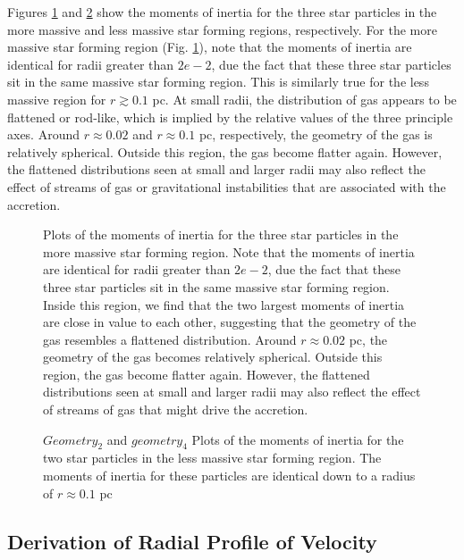\documentclass{emulateapj}
\begin{document}
Figures \ref{fig:geometry} and \ref{fig:geometry 2} show the moments of inertia for the three star particles in the more massive and less massive star forming regions, respectively.  For the more massive star forming region (Fig. \ref{fig:geometry}), note that the moments of inertia are identical for radii greater than $2e-2$, due the fact that these three star particles sit in the same massive star forming region. This is similarly true for the less massive region for $r\gtrsim 0.1$ pc.  At small radii, the distribution of gas appears to be flattened or rod-like, which is implied by the relative values of the three principle axes.  Around $r\approx 0.02$ and $r \approx 0.1$ pc, respectively, the geometry of the gas is relatively spherical.  Outside this region, the gas become flatter again. However, the flattened distributions seen at small and larger radii may also reflect the effect of streams of gas or gravitational instabilities that are associated with the accretion. 

\begin{figure}
\caption{Plots of the moments of inertia for the three star particles in the more massive star forming region.  Note that the moments of inertia are identical for radii greater than $2e-2$, due the fact that these three star particles sit in the same massive star forming region.  Inside this region, we find that the two largest moments of inertia are close in value to each other, suggesting that the geometry of the gas resembles a flattened distribution. Around $r\approx 0.02$ pc, the geometry of the gas becomes relatively spherical.  Outside this region, the gas become flatter again. However, the flattened distributions seen at small and larger radii may also reflect the effect of streams of gas that might drive the accretion. 
\label{fig:geometry}}
\end{figure}

\begin{figure}
\caption{$Geometry_2$ and $geometry_4$ Plots of the moments of inertia for the two star particles in the less massive star forming region.  The moments of inertia for these particles are identical down to a radius of $r\approx 0.1$ pc
\label{fig:geometry 2}}
\end{figure}


\subsection{Derivation of Radial Profile of Velocity}
\end{document}
